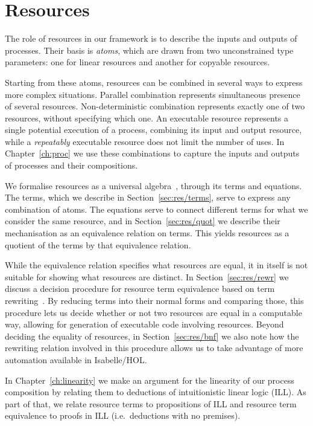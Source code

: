 \documentclass[class=smolathesis,crop=false]{standalone}
\begin{document}
\chapter{Resources}
\label{ch:res}

The role of resources in our framework is to describe the inputs and outputs of processes.
Their basis is \emph{atoms}, which are drawn from two unconstrained type parameters: one for linear resources and another for copyable resources.

Starting from these atoms, resources can be combined in several ways to express more complex situations.
Parallel combination represents simultaneous presence of several resources.
Non-deterministic combination represents exactly one of two resources, without specifying which one.
An executable resource represents a single potential execution of a process, combining its input and output resource, while a \emph{repeatably} executable resource does not limit the number of uses.
In Chapter~\ref{ch:proc} we use these combinations to capture the inputs and outputs of processes and their compositions.

We formalise resources as a universal algebra~\cite{baader_nipkow-1998-ch03}, through its terms and equations.
The terms, which we describe in Section~\ref{sec:res/terms}, serve to express any combination of atoms.
The equations serve to connect different terms for what we consider the same resource, and in Section~\ref{sec:res/quot} we describe their mechanisation as an equivalence relation on terms.
This yields resources as a quotient of the terms by that equivalence relation.

While the equivalence relation specifies what resources are equal, it in itself is not suitable for showing what resources are distinct.
In Section~\ref{sec:res/rewr} we discuss a decision procedure for resource term equivalence based on term rewriting~\cite{baader_nipkow-1998}.
By reducing terms into their normal forms and comparing those, this procedure lets us decide whether or not two resources are equal in a computable way, allowing for generation of executable code involving resources.
Beyond deciding the equality of resources, in Section~\ref{sec:res/bnf} we also note how the rewriting relation involved in this procedure allows us to take advantage of more automation available in Isabelle/HOL.

In Chapter~\ref{ch:linearity} we make an argument for the linearity of our process composition by relating them to deductions of intuitionistic linear logic (ILL).
As part of that, we relate resource terms to propositions of ILL and resource term equivalence to proofs in ILL (i.e.\ deductions with no premises).
\end{document}
